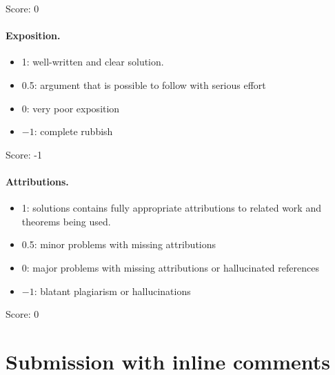 \documentclass[11pt]{article}
\theoremstyle{definition}
\theoremstyle{remark}
\newcommand{\eps}{\varepsilon}
\begin{document}
\noindent Score: 0

\paragraph{Exposition.}
\begin{itemize}
	\item  1: well-written and clear solution.
	\item  0.5: argument that is possible to follow with serious effort
	\item  0: very poor exposition
	\item  $-1$: complete rubbish
\end{itemize}

\noindent Score: -1

\paragraph{Attributions.}
\begin{itemize}
	\item  1: solutions contains fully appropriate attributions
		to related work and theorems being used.
	\item  0.5: minor problems with missing attributions
	\item  0: major problems with missing attributions or hallucinated
		 references
	\item  $-1$: blatant plagiarism or hallucinations
\end{itemize}

\noindent Score: 0

\newpage
\section{Submission with inline comments}


\begin{abstract}
Let $X$ be a smooth vector field on a compact connected manifold without boundary, and suppose that every scalar distribution $u$ is smooth whenever $Xu$ is smooth. The question is whether the generated flow has zero topological entropy. We prove that the scalar kernel consists of constants, the smooth range of $X$ is closed, and the flow is nonwandering. We give two approximation criteria for a positive smooth invariant density. Fix a normalized Riemannian density $\rho$ and its Laplacian $\Delta$. For the stationary probability densities $a_\eps\rho$ of $X+\eps\Delta$, we prove $\eps\|\log a_\eps\|_\infty\to0$; boundedness of $-\int_M\log a_\eps\,\rho$ along a sequence $\eps\downarrow0$ is a stronger condition, equivalent here to existence of a positive smooth invariant density. We also prove a conditional entropy criterion and an exact suspension reduction. These results do not establish zero entropy in general: construction of an invariant density and the subsequent entropy implication remain unresolved by the arguments given here.
\end{abstract}
\end{document}
